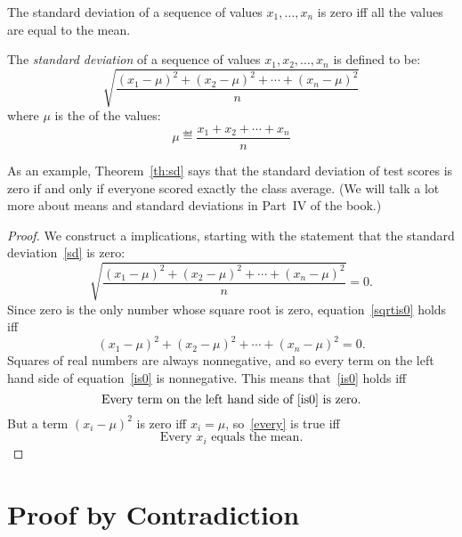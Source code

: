 \begin{theorem}\label{th:sd}
The standard deviation of a sequence of values $x_1, \dots, x_n$ is
zero iff all the values are equal to the mean.
\end{theorem}

\begin{definition*}
The \textit{standard deviation} of a sequence of values $x_1, x_2,
\dots, x_n$ is defined to be:
%
\begin{equation}\label{sd}
\sqrt{\frac{(x_1 - \mu)^2 + (x_2 - \mu)^2 + \cdots + (x_n - \mu)^2}{n}}
\end{equation}
%
where $\mu$ is the  of the values:
%
\[
\mu \eqdef \frac{x_1 + x_2 + \cdots + x_n}{n}
\]
\end{definition*}

As an example, Theorem~\ref{th:sd} says that the standard deviation of
test scores is zero if and only if everyone scored exactly the class
average.  (We will talk a lot more about means and standard deviations
in Part~IV of the book.)

\begin{proof}
We construct a  implications, starting with the
statement that the standard deviation~\eqref{sd} is zero:
%
\begin{equation}\label{sqrtis0}
\sqrt{\frac{(x_1 - \mu)^2 + (x_2 - \mu)^2 + \cdots + (x_n - \mu)^2}{n}} = 0.
\end{equation}
%
Since zero is the only number whose square root is zero,
equation~\eqref{sqrtis0} holds iff
\begin{equation}\label{is0}
(x_1 - \mu)^2 + (x_2 - \mu)^2 + \cdots + (x_n - \mu)^2 = 0.
\end{equation}
Squares of real numbers are always nonnegative, and so every term on the
left hand side of equation~\eqref{is0} is nonnegative.  This means
that~\eqref{is0} holds iff
\begin{equation}\label{every}
\text{Every term on the left hand side of~\eqref{is0} is zero.}
\end{equation}
But a term $(x_i - \mu)^2$ is zero iff $x_i=\mu$, so~\eqref{every} is true
iff
\[
\text{Every $x_i$ equals the mean.}
\]

\end{proof}


\section{Proof by Contradiction}\label{contradiction}

